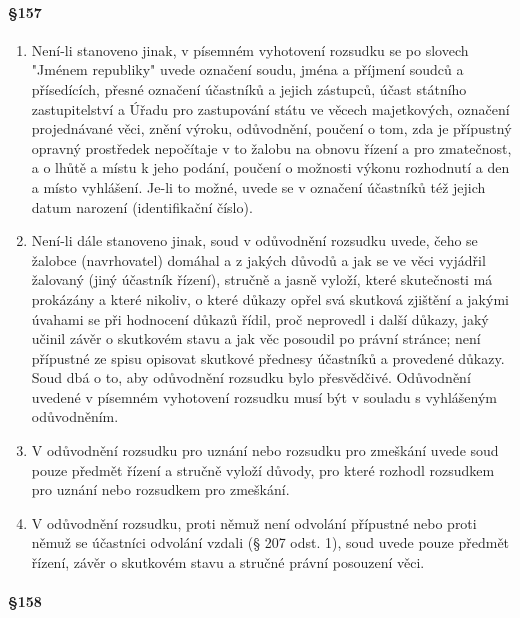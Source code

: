 \paragraph{\S 157}

\begin{enumerate}[label={(\arabic*)}]
  \item Není-li stanoveno jinak, v písemném vyhotovení rozsudku se po slovech "Jménem republiky" uvede označení soudu, jména a příjmení soudců a přísedících, přesné označení účastníků a jejich zástupců, účast státního zastupitelství a Úřadu pro zastupování státu ve věcech majetkových, označení projednávané věci, znění výroku, odůvodnění, poučení o tom, zda je přípustný opravný prostředek nepočítaje v to žalobu na obnovu řízení a pro zmatečnost, a o lhůtě a místu k jeho podání, poučení o možnosti výkonu rozhodnutí a den a místo vyhlášení. Je-li to možné, uvede se v označení účastníků též jejich datum narození (identifikační číslo).
  \item Není-li dále stanoveno jinak, soud v odůvodnění rozsudku uvede, čeho se žalobce (navrhovatel) domáhal a z jakých důvodů a jak se ve věci vyjádřil žalovaný (jiný účastník řízení), stručně a jasně vyloží, které skutečnosti má prokázány a které nikoliv, o které důkazy opřel svá skutková zjištění a jakými úvahami se při hodnocení důkazů řídil, proč neprovedl i další důkazy, jaký učinil závěr o skutkovém stavu a jak věc posoudil po právní stránce; není přípustné ze spisu opisovat skutkové přednesy účastníků a provedené důkazy. Soud dbá o to, aby odůvodnění rozsudku bylo přesvědčivé. Odůvodnění uvedené v písemném vyhotovení rozsudku musí být v souladu s vyhlášeným odůvodněním.
  \item V odůvodnění rozsudku pro uznání nebo rozsudku pro zmeškání uvede soud pouze předmět řízení a stručně vyloží důvody, pro které rozhodl rozsudkem pro uznání nebo rozsudkem pro zmeškání.
  \item V odůvodnění rozsudku, proti němuž není odvolání přípustné nebo proti němuž se účastníci odvolání vzdali (§ 207 odst. 1), soud uvede pouze předmět řízení, závěr o skutkovém stavu a stručné právní posouzení věci.
\end{enumerate}

\paragraph{\S 158}

